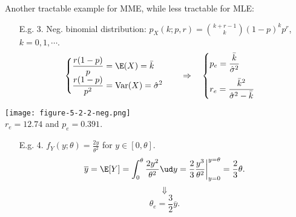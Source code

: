 \begin{frame}
  Another tractable example for MME, while less tractable for MLE: \\
  \vfill
  \begin{enumerate}
  \item[E.g. 3.] Neg. binomial distribution: $p_X(k;p,r)={k+r-1\choose k}(1-p)^k p^r$, $k=0,1,\cdots$.
 \[
  \begin{cases}
   \displaystyle
   \frac{r(1-p)}{p} =\E(X) = \bar{k}\\
   \displaystyle
   \frac{r(1-p)}{p^2}= \text{Var}(X) =  \hat{\sigma}^2
  \end{cases}
  \quad\Rightarrow\quad
  \begin{cases}
   \displaystyle
   p_e = \frac{\bar{k}}{\hat{\sigma}^2} \\[1em]
   \displaystyle
   r_e = \frac{\bar{k}^2}{\hat{\sigma}^2-\bar{k}}
  \end{cases}
  \]
 \end{enumerate}

\end{frame}
\begin{frame}
\begin{center}
 \texttt{[image: figure-5-2-2-neg.png]}\\
 {$r_e=12.74$ and $p_e=0.391$.}
\end{center}
\end{frame}
\begin{frame}
  \begin{enumerate}
  \item[E.g. 4.] $f_Y(y;\theta) = \frac{2y}{\theta^2}$ for $y\in [0,\theta]$.\\[2em]
  \[
  \overline{y} = \E[Y] = \int_0^\theta \frac{2y^2}{\theta^2}\ud y = \frac{2}{3} \frac{y^3}{\theta^2}\bigg|_{y=0}^{y=\theta} = \frac{2}{3}\theta.
  \]
  \[
  \Downarrow
  \]
  \[
  \boxed{\theta_e = \frac{3}{2}\overline{y}.}
  \]
 \end{enumerate}

\end{frame}
